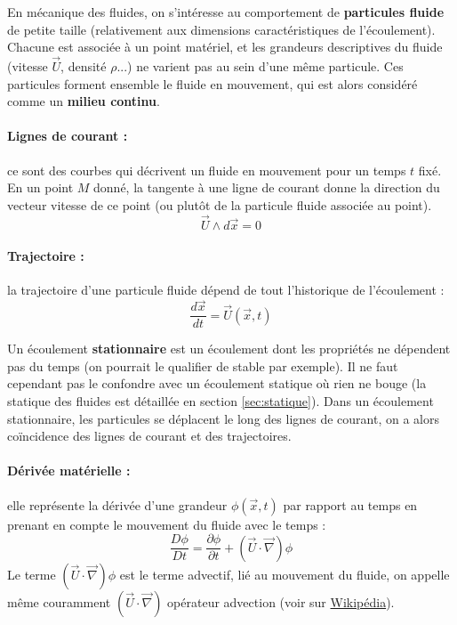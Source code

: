 
En mécanique des fluides, on s'intéresse au comportement de \textbf{particules fluide} de petite taille (relativement aux dimensions caractéristiques de l'écoulement). Chacune est associée à un point matériel, et les grandeurs descriptives du fluide (vitesse $\vec{U}$, densité $\rho$...) ne varient pas au sein d'une même particule. Ces particules forment ensemble le fluide en mouvement, qui est alors considéré comme un \textbf{milieu continu}.

\paragraph{Lignes de courant :}ce sont des courbes qui décrivent un fluide en mouvement pour un temps $t$ fixé. En un point $M$ donné, la tangente à une ligne de courant donne la direction du vecteur vitesse de ce point (ou plutôt de la particule fluide associée au point).
%
\begin{equation}
\vec{U}\wedge d\vec{x}=0
\end{equation}

\paragraph{Trajectoire :}la trajectoire d'une particule fluide dépend de tout l'historique de l'écoulement :
%
\begin{equation}
\frac{d\vec{x}}{dt} = \vec{U}(\vec{x},t)
\end{equation}

Un écoulement \textbf{stationnaire} est un écoulement dont les propriétés ne dépendent pas du temps (on pourrait le qualifier de stable par exemple). Il ne faut cependant pas le confondre avec un écoulement statique où rien ne bouge (la statique des fluides est détaillée en section \ref{sec:statique}). Dans un écoulement stationnaire, les particules se déplacent le long des lignes de courant, on a alors coïncidence des lignes de courant et des trajectoires.

\paragraph{Dérivée matérielle :}elle représente la dérivée d'une grandeur $\phi(\vec{x},t)$ par rapport au temps en prenant en compte le mouvement du fluide avec le temps :
%
\begin{equation}
\frac{D\phi}{Dt} = \frac{\partial{\phi}}{\partial{t}} + \left( \vec{U} \cdot \vec{\nabla} \right) \phi
\end{equation}
%
Le terme $\left( \vec{U} \cdot \vec{\nabla} \right) \phi$ est le terme advectif, lié au mouvement du fluide, on appelle même couramment $\left( \vec{U} \cdot \vec{\nabla} \right)$ opérateur advection (voir sur \href{https://fr.wikipedia.org/wiki/Advection}{Wikipédia}).

